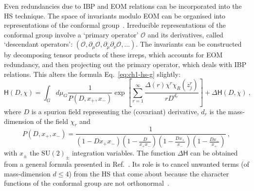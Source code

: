 Even redundancies due to IBP and EOM relations can be incorporated into the HS
technique. The space of invariants modulo EOM can be organised into
representations of the conformal group~\cite{Henning:2017fpj, Henning:2015alf}.
Irreducible representations of the conformal group involve a `primary operator'
$\mathcal{O}$ and its derivatives, called `descendant operators':
$(\mathcal{O}, \partial_{\mu}\mathcal{O}, \partial_{\mu}\partial_{\nu}\mathcal{O}, \ldots)$.
The invariants can be constructed by decomposing tensor products of these
irreps, which accounts for EOM redundancy, and then projecting out the primary
operator, which deals with IBP relations. This alters the formula
Eq.~\eqref{eq:ch1-hs-g} slightly:
\begin{equation}
  \label{eq:ch1-hs-full}
  \mathsf{H}(D, \chi) = \int_{G} d\mu_{G} \frac{1}{P(D, x_{+}, x_{-})} \exp \left[ \sum_{r=1}^{\infty} \frac{\Delta(r) \chi^{r} \chi_{R}(z_{j}^{r})}{r D^{d_{r}}} \right] + \Delta \mathsf{H}(D, \chi) \ ,
\end{equation}
where $D$ is a spurion field representing the (covariant) derivative, $d_{r}$ is
the mass-dimension of the field $\chi_{r}$ and
\begin{equation}
  P(D, x_{+}, x_{-}) = \frac{1}{(1-Dx_{+}x_{-})\left(1-\frac{D}{x_{+}x_{-}}\right)\left(1-\frac{Dx_{+}}{x_{-}}\right)\left(1 - \frac{Dx_{-}}{x_{+}}\right)} \ ,
\end{equation}
with $x_{\pm}$ the $\mathrm{SU}(2)_{\pm}$ integration variables. The function
$\Delta \mathsf{H}$ can be obtained from a general formula presented in
Ref.~\cite{Henning:2017fpj}. Its role is to cancel unwanted terms (of
mass-dimension $d \leq 4$) from the HS that come about because the character
functions of the conformal group are not orthonormal~\cite{Henning:2017fpj}.

